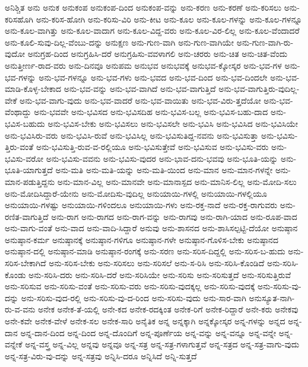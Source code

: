 {ಅನಿಶ್ಚಿತ
ಅನು
ಅನುಕ
ಅನುಕಂಪ
ಅನುಕಂಪ-ದಿಂದ
ಅನುಕಂಪ-ವನ್ನು
ಅನು-ಕರಣ
ಅನು-ಕರಣೆ
ಅನು-ಕರಿಸಲು
ಅನು-ಕರಿಸಹೊಗಿ
ಅನು-ಕರಿಸ-ಹೋಗಿ
ಅನು-ಕರಿಸು-ವಿರಿ
ಅನು-ಕೀಟ
ಅನು-ಕೂಲ
ಅನು-ಕೂಲ-ಗಳನ್ನು
ಅನು-ಕೂಲ-ಗಳನ್ನೂ
ಅನು-ಕೂಲ-ವಾಗಿತ್ತು
ಅನು-ಕೂಲ-ವಾದಾಗ
ಅನು-ಕೂಲ-ವಿದ್ದ-ವರು
ಅನು-ಕೂಲ-ವಿರ-ಲಿಲ್ಲ
ಅನು-ಕೂಲ-ವೆಂದಾದರೆ
ಅನು-ಕೂಲಿ-ಸುವು-ದಿಲ್ಲ-ವೆಂಬು-ದನ್ನು
ಅನುಕ್ಷಣ
ಅನು-ಗುಣ-ವಾಗಿ
ಅನು-ಗುಣ-ವಾಗಿಯೇ
ಅನು-ಗುಣ-ವಾಗಿ-ರು-ವುದೋ
ಅನುಗ್ರಹ-ದಿಂದ
ಅನುಗ್ರಹಿಸಿ-ದರೆ
ಅನುಗ್ರಹಿಸು-ವವಳಾಗಲಿ
ಅನು-ಚರರು
ಅನು-ಚಿತ
ಅನು-ಚಿತ-ವೆಂದು
ಅನುತ್ತೀರ್ಣ-ರಾದ-ವರು
ಅನು-ದಿನವೂ
ಅನುಪಮ
ಅನುಭವ
ಅನುಭವಕ್ಕೆ
ಅನುಭವ-ಕ್ಕೋಸ್ಕರ
ಅನು-ಭವ-ಗಳ
ಅನು-ಭವ-ಗಳನ್ನು
ಅನು-ಭವ-ಗಳನ್ನೂ
ಅನು-ಭವ-ಗಳು
ಅನು-ಭವದ
ಅನು-ಭವ-ದಿಂದ
ಅನು-ಭವ-ದಿಂದಲೇ
ಅನು-ಭವ-ಮಾಡಿ-ಕೊಳ್ಳ-ಬೇಕಾದ
ಅನು-ಭವ-ವನ್ನು
ಅನು-ಭವ-ವಾಗಿದೆ
ಅನು-ಭವ-ವಾಗುತ್ತಿದೆ
ಅನು-ಭವ-ವಾಗುತ್ತಿರು-ವುದಿಲ್ಲ-ವೇಕೆ
ಅನು-ಭವ-ವಾಗು-ವುದು
ಅನು-ಭವ-ವಾದರೆ
ಅನು-ಭವ-ವಾಯಿತು
ಅನು-ಭವ-ವಿರು-ತ್ತದೆಯೋ
ಅನು-ಭವ-ವೆಂಥಾದ್ದು
ಅನು-ಭವವೇ
ಅನು-ಭವಿಸದ
ಅನು-ಭವಿಸದಿಹ
ಅನು-ಭವಿಸ-ಬಲ್ಲ
ಅನು-ಭವಿಸ-ಬಹು-ದಾದ
ಅನು-ಭವಿಸ-ಬಹುದು
ಅನು-ಭವಿಸ-ಬೇಕು
ಅನು-ಭವಿಸಲು
ಅನು-ಭವಿಸಲೇ
ಅನು-ಭವಿಸಿ
ಅನು-ಭವಿಸಿದ
ಅನು-ಭವಿಸಿಯೇ
ಅನು-ಭವಿಸಿರು-ವರು
ಅನು-ಭವಿಸಿ-ರುವೆ
ಅನು-ಭವಿಸಿಲ್ಲ
ಅನು-ಭವಿಸುತಿದ್ದ-ನವನು
ಅನು-ಭವಿಸುತ್ತಾ
ಅನು-ಭವಿಸು-ತ್ತಿರು-ವಂತೆ
ಅನು-ಭವಿಸುತ್ತಿ-ರುವ-ವ-ರಲ್ಲಿಯೂ
ಅನು-ಭವಿಸುತ್ತೇವೆ
ಅನು-ಭವಿಸುವ
ಅನು-ಭವಿಸು-ವರು
ಅನು-ಭವಿಸು-ವರೋ
ಅನು-ಭವಿಸು-ವವನು
ಅನು-ಭವಿಸು-ವುದರ
ಅನು-ಭಾವ-ದನು-ಭವವು
ಅನು-ಭೂತಿ-ಯನ್ನು
ಅನು-ಭೂತಿ-ಯಾಗುತ್ತದೆ
ಅನು-ಮತಿ
ಅನು-ಮತಿ-ಯನ್ನು
ಅನು-ಮತಿ-ಯಿಂದ
ಅನು-ಮಾನ
ಅನು-ಮಾನ-ಗಳನ್ನೇ
ಅನು-ಮಾನ-ಪಡುತ್ತಿದ್ದನು
ಅನು-ಮಾನ-ವಿಲ್ಲ
ಅನು-ಮಾನವೇ
ಅನು-ಮಾನಾಸ್ಪದ
ಅನು-ಮಾನಿಸ-ಲಿಲ್ಲ
ಅನು-ಮೋದಿ-ಸಲು
ಅನು-ಮೋದಿಸಿದ್ದಾರೆ-ಯೇನು
ಅನು-ಮೋದಿಸು-ವುದಿಲ್ಲ
ಅನುಯಾಯಿ-ಗಳಲ್ಲಿ
ಅನುಯಾಯಿ-ಗಳಲ್ಲಿಯೂ
ಅನುಯಾಯಿ-ಗಳಷ್ಟು
ಅನುಯಾಯಿ-ಗಳಿಂದಲೂ
ಅನುಯಾಯಿ-ಗಳು
ಅನು-ರಕ್ತ-ನಾದೆ
ಅನು-ರಕ್ತ-ರಾಗುವರು
ಅನು-ರಣಿತ-ವಾಗುತ್ತಿದೆ
ಅನು-ರಾಗ
ಅನು-ರಾಗದ
ಅನು-ರಾಗ-ವನ್ನು
ಅನು-ರಾಗವು
ಅನು-ರಾಗಿ-ಯಾದ
ಅನು-ರೂಪ-ವಾದ
ಅನು-ವಾಗು-ವಂತೆ
ಅನು-ವಾದ
ಅನು-ವಾದಿ-ಸಿದ್ದಾರೆ
ಅನುವು
ಅನು-ಶಾಸನದ
ಅನು-ಶಾಸಿಸಲ್ಪಟ್ಟಿ-ದೆಯೋ
ಅನುಷ್ಠಾನ
ಅನುಷ್ಠಾನ-ಕರ್ಮ
ಅನುಷ್ಠಾನಕ್ಕೆ
ಅನುಷ್ಠಾನ-ಗಳಿಗೂ
ಅನುಷ್ಠಾನ-ಗಳೇ
ಅನುಷ್ಠಾನ-ಗೊಳಿಸ-ಬೇಕು
ಅನುಷ್ಠಾನದ
ಅನುಷ್ಠಾನ-ದಲ್ಲಿ
ಅನುಷ್ಠಾನ-ಮಾಡಿ
ಅನುಷ್ಠಾನ-ರಂಗಕ್ಕೆ
ಅನು-ಸರಣ
ಅನು-ಸರಿಸ-ದಿದ್ದಲ್ಲಿ
ಅನು-ಸರಿಸ-ಬ-ಹುದು
ಅನು-ಸರಿಸ-ಬೇಕಾಗಿದೆ
ಅನು-ಸರಿಸ-ಬೇಕು
ಅನು-ಸರಿಸಲು
ಅನು-ಸರಿಸಲೆ
ಅನು-ಸ-ರಿಸಿ
ಅನು-ಸರಿಸಿ-ಕೊಂಡಿದೆ
ಅನು-ಸರಿಸಿ-ಕೊಂಡು
ಅನು-ಸರಿಸಿ-ದರು
ಅನು-ಸರಿಸಿ-ದರೆ
ಅನು-ಸರಿಸಿಯೇ
ಅನು-ಸರಿಸು
ಅನು-ಸರಿಸುತ್ತದೆ
ಅನು-ಸರಿಸುತ್ತಿರುವೆ
ಅನು-ಸರಿಸುವ
ಅನು-ಸರಿಸು-ವಂತೆ
ಅನು-ಸರಿಸು-ವರು
ಅನು-ಸರಿಸು-ವುದಕ್ಕಲ್ಲ
ಅನು-ಸರಿಸು-ವುದಕ್ಕೆ
ಅನು-ಸರಿಸು-ವು-ದನ್ನು
ಅನು-ಸರಿಸು-ವುದ-ರಲ್ಲಿ
ಅನು-ಸರಿಸು-ವು-ದ-ರಿಂದ
ಅನು-ಸರಿಸು-ವುದು
ಅನು-ಸಾರ-ವಾಗಿ
ಅನುಸ್ಯೂತ-ನಾಗಿ-ರು-ವ-ವನು
ಅನೇಕ
ಅನೇಕ-ತೆ-ಯಲ್ಲಿ
ಅನೇ-ಕದ
ಅನೇಕ-ರದಕ್ಕಿಂತ
ಅನೇಕ-ರಿಗೆ
ಅನೇಕ-ರಿದ್ದಾರೆ
ಅನೇ-ಕರು
ಅನೇಕವು
ಅನೇ-ಕವೇ
ಅನೇಕ-ವೇಳೆ
ಅನೇಕ-ಸಲ
ಅನೇಕ-ಸಾರಿ
ಅನೈತಿಕ
ಅನ್ನ
ಅನ್ನಕ್ಕಾಗಿ
ಅನ್ನಕ್ಕೋಸ್ಕರ
ಅನ್ನ-ಗಳನ್ನು
ಅನ್ನದ
ಅನ್ನ-ದಾನ
ಅನ್ನ-ದಾನ-ದಿಂದ
ಅನ್ನ-ದಿಂದ
ಅನ್ನ-ದೊಂದಿಗೆ
ಅನ್ನ-ಪೂರ್ಣೆಯ
ಅನ್ನ-ವನ್ನು
ಅನ್ನ-ವನ್ನೂ
ಅನ್ನ-ವನ್ನೇ
ಅನ್ನ-ವನ್ನೇಕೆ
ಅನ್ನ-ವಸ್ತ್ರ
ಅನ್ನ-ವಿಲ್ಲ
ಅನ್ನವು
ಅನ್ನವೂ
ಅನ್ನ-ಸತ್ರ
ಅನ್ನ-ಸತ್ರ-ಗಳಾಗುತ್ತವೆ
ಅನ್ನ-ಸತ್ರದ
ಅನ್ನ-ಸತ್ರ-ವಾಗು-ವುದು
ಅನ್ನ-ಸತ್ರ-ವಿರು-ವು-ದನ್ನು
ಅನ್ನ-ಸತ್ರವು
ಅನ್ನಿಸಿ-ದರೂ
ಅನ್ನಿಸಿದೆ
ಅನ್ನಿ-ಸುತ್ತದೆ
}
